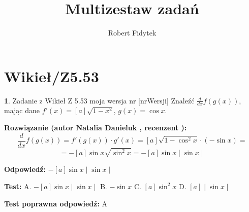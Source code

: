 \documentclass[12pt, a4paper]{article}
\title{Multizestaw zadań}
\author{Robert Fidytek}
\date{}
\theoremstyle{definition} %
\newtheorem{zad}{}
\newcommand{\kategoria}[1]{\section{#1}} %
\newcommand{\zadStart}[1]{\begin{zad}#1\newline} %
\newcommand{\zadStop}{\end{zad}}   %
\newcommand{\rozwStart}[2]{\noindent \textbf{Rozwiązanie (autor #1 , recenzent #2): }\newline} %
\newcommand{\rozwStop}{\newline}                                            %
\newcommand{\odpStart}{\noindent \textbf{Odpowiedź:}\newline}    %
\newcommand{\odpStop}{\newline}                                             %
\newcommand{\testStart}{\noindent \textbf{Test:}\newline} %
\newcommand{\testStop}{\newline} %
\newcommand{\kluczStart}{\noindent \textbf{Test poprawna odpowiedź:}\newline} %
\newcommand{\kluczStop}{\newline} %
\begin{document}
\maketitle

\kategoria{Wikieł/Z5.53}

\zadStart{Zadanie z Wikieł Z 5.53 moja wersja nr [nrWersji]}
Znaleźć $\frac{d}{dx} f(g(x))$, mając dane $f'(x) = [a]\sqrt{1 - x^2}$, $g(x) = \cos x$.
\zadStop

\rozwStart{Natalia Danieluk}{}
$$\frac{d}{dx} f(g(x)) = f'(g(x)) \cdot g'(x) = [a]\sqrt{1 - \cos^2 x} \cdot (-\sin x) = $$
$$= -[a]\sin x \sqrt{\sin^2 x} = -[a]\sin x \mid \sin x \mid$$
\rozwStop

\odpStart
$-[a]\sin x \mid \sin x \mid$
\odpStop

\testStart
A. $-[a]\sin x \mid \sin x \mid$
B. $-\sin x$
C. $[a]\sin^2 x$
D. $[a]\mid \sin x \mid$
\testStop

\kluczStart
A
\kluczStop
\end{document}
